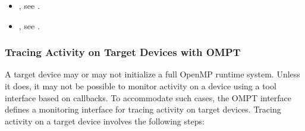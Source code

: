 \crossreferences
\begin{itemize}
\item {}, see .
\item {}, see .
\end{itemize}




\subsubsection{Tracing Activity on Target Devices with OMPT}
\label{sec:tracing-device-activity}

A target device may or may not initialize a full OpenMP runtime system.
Unless it does, it may not be possible to monitor activity 
on a device using a tool interface based on callbacks.
To accommodate such cases, the OMPT interface defines 
a monitoring interface for tracing activity on target
devices. Tracing activity on a target device involves the following
steps:

